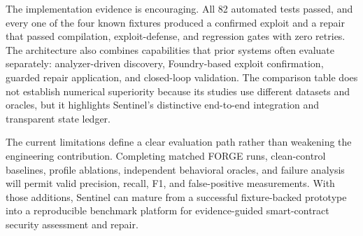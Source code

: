 \documentclass[conference,a4paper,10pt]{IEEEtran}
\begin{document}
The implementation evidence is encouraging. All 82 automated tests passed, and every one of the four known fixtures produced a confirmed exploit and a repair that passed compilation, exploit-defense, and regression gates with zero retries. The architecture also combines capabilities that prior systems often evaluate separately: analyzer-driven discovery, Foundry-based exploit confirmation, guarded repair application, and closed-loop validation. The comparison table does not establish numerical superiority because its studies use different datasets and oracles, but it highlights Sentinel's distinctive end-to-end integration and transparent state ledger.

The current limitations define a clear evaluation path rather than weakening the engineering contribution. Completing matched FORGE runs, clean-control baselines, profile ablations, independent behavioral oracles, and failure analysis will permit valid precision, recall, F1, and false-positive measurements. With those additions, Sentinel can mature from a successful fixture-backed prototype into a reproducible benchmark platform for evidence-guided smart-contract security assessment and repair.
\end{document}

